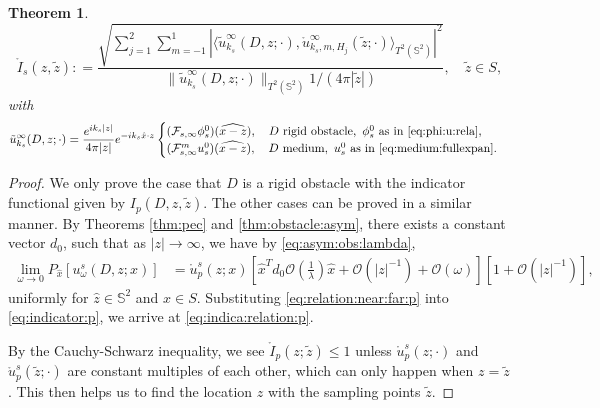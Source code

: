 \documentclass[a4paper,11pt]{article}
\newcommand{\mO}{\mathcal{O}}
\newtheorem{theorem}{Theorem}[section]
\theoremstyle{remark}
\theoremstyle{definition}
\numberwithin{equation}{section}
\begin{document}
\begin{theorem}
\begin{equation}\label{eq:indicator:asym}
\mathring{I}_{s}(z, \tilde{z}): = \frac{\sqrt{\sum_{j=1}^2\sum_{m=-1}^1|\langle \tilde{u}_{k_s}^{\infty}(D,z;\cdot), \mathring{u}_{k_s,m, H_j}^{\infty}(\tilde{z};\cdot)\rangle_{T^{2}(\mathbb{S}^2)}|^2}}{\|\tilde{u}_{k_s}^{\infty}(D,z;\cdot)\|_{T^2(\mathbb{S}^2)} 1/{(4\pi |\tilde{z}|)}}, \quad \tilde{z} \in S,
\end{equation}
with
\[
\tilde{u}_{k_s}^{\infty}(D,z;\cdot) =  \frac{e^{ik_s|z|}}{4 \pi |z|} e^{-ik_s\hat{x}\cdot z} \begin{cases} (\mathcal{F}_{s,\infty}\phi_{s}^0)(\widehat{x-z}), \quad D \ \text{rigid obstacle}, \ \phi_{s}^0 \  \text{as in} \ \eqref{eq:phi:u:rela}, \ \\
(\mathcal{F}^m_{s,\infty}u_{s}^0)(\widehat{x-z}), \quad D \  \text{medium}, \ u_{s}^0 \  \text{as in}\  \eqref{eq:medium:fullexpan}.
\end{cases}
\]


\end{theorem}
\begin{proof}
We only prove the case that $D$ is a rigid obstacle with the indicator functional given by $I_{p}(D,z, \tilde{z})$. The other cases can be proved in a similar manner. By Theorems \ref{thm:pec} and \ref{thm:obstacle:asym}, there exists a constant vector $d_0$, such that
as $|z|\rightarrow \infty$,  we have by \eqref{eq:asym:obs:lambda},
\begin{align}
\lim_{\omega \rightarrow 0} P_{\hat{x}}[u_{\omega}^s(D,z;x)] &= \mathring{u}_{p}^s(z;x)[\hat{x}^Td_{0}\mO(\frac{1}{\lambda}) \hat{x} +
\mathcal{O}(|z|^{-1}) + \mO(\omega)][1+ \mathcal{O}(|z|^{-1})], \label{eq:relation:near:far:p}
\end{align}
uniformly for $\hat{z}\in \mathbb{S}^2$ and $x\in S$. Substituting  \eqref{eq:relation:near:far:p} into \eqref{eq:indicator:p}, we arrive at \eqref{eq:indica:relation:p}.

By the Cauchy-Schwarz inequality, we see $ \mathring{I}_{p}(z;\tilde{z})  \leq 1$ unless $\mathring{u}_{p}^s(z;\cdot)$ and $\mathring{u}_{p}^s(\tilde{z};\cdot)$ are constant multiples of each other, which can only happen when $z=\tilde{z}$. This then helps us to find the location $z$ with the sampling points $\tilde{z}$.

\end{proof}
\end{document}
